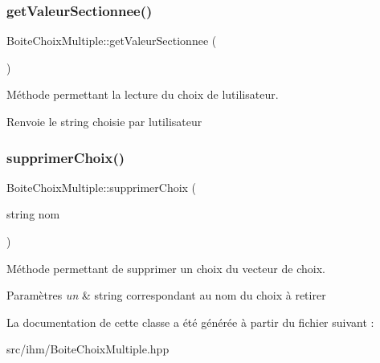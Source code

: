 \subsubsection{\texorpdfstring{get\+Valeur\+Sectionnee()}{getValeurSectionnee()}}
{\footnotesize\ttfamily Boite\+Choix\+Multiple\+::get\+Valeur\+Sectionnee (\begin{DoxyParamCaption}{ }\end{DoxyParamCaption})}



Méthode permettant la lecture du choix de l\textquotesingle{}utilisateur. 

\begin{DoxyReturn}{Renvoie}
le string choisie par l\textquotesingle{}utilisateur 
\end{DoxyReturn}
\mbox{\label{classBoiteChoixMultiple_ab37e456d084fb9e70d7e24df0839916f}} 
\subsubsection{\texorpdfstring{supprimer\+Choix()}{supprimerChoix()}}
{\footnotesize\ttfamily Boite\+Choix\+Multiple\+::supprimer\+Choix (\begin{DoxyParamCaption}\item[{string}]{nom }\end{DoxyParamCaption})}



Méthode permettant de supprimer un choix du vecteur de choix. 


\begin{DoxyParams}{Paramètres}
{\em un} & string correspondant au nom du choix à retirer \\
\hline
\end{DoxyParams}


La documentation de cette classe a été générée à partir du fichier suivant \+:\begin{DoxyCompactItemize}
\item 
src/ihm/Boite\+Choix\+Multiple.\+hpp\end{DoxyCompactItemize}

